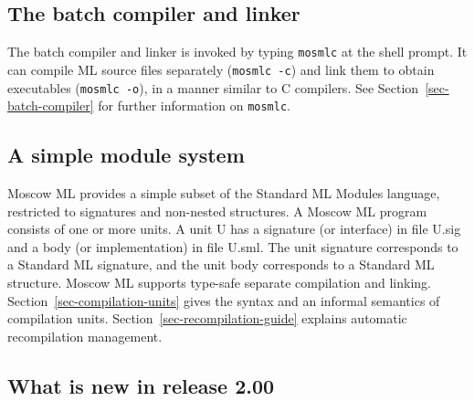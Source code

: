 \documentclass[fleqn]{article}
\begin{document}
\subsection{The batch compiler and linker}

The batch compiler and linker is invoked by typing {\tt mosmlc} at the
shell prompt.  It can compile ML source files separately ({\tt mosmlc
  -c}) and link them to obtain executables ({\tt mosmlc -o}), in a
manner similar to C compilers.  See Section~\ref{sec-batch-compiler}
for further information on {\tt mosmlc}.


\subsection{A simple module system}

Moscow ML provides a simple subset of the Standard ML Modules
language, restricted to signatures and non-nested structures.  A
Moscow ML program consists of one or more units.  A unit U has a
signature (or interface) in file U.sig and a body (or implementation)
in file U.sml.  The unit signature corresponds to a Standard ML
signature, and the unit body corresponds to a Standard ML structure.
Moscow ML supports type-safe separate compilation and linking.
Section~\ref{sec-compilation-units} gives the syntax and an informal
semantics of compilation units.  Section~\ref{sec-recompilation-guide}
explains automatic recompilation management.


\subsection{What is new in release 2.00}
\end{document}
